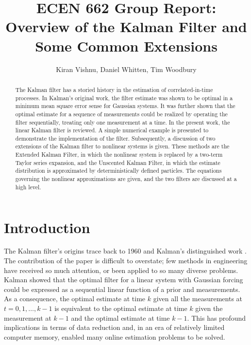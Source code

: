 \documentclass[12pt,draftcls,onecolumn]{IEEEtran}
\author{Kiran Vishnu, Daniel Whitten, Tim Woodbury}
\title{ECEN 662 Group Report: Overview of the Kalman Filter and Some Common Extensions}
\begin{document}
\maketitle

\begin{abstract}
The Kalman filter has a storied history in the estimation of correlated-in-time processes.
In Kalman's original work, the filter estimate was shown to be optimal in a minimum mean square error sense for Gaussian systems. It was further shown that the optimal estimate for a sequence of measurements could be realized by operating the filter sequentially, treating only one measurement at a time.
In the present work, the linear Kalman filter is reviewed.
A simple numerical example is presented to demonstrate the implementation of the filter.
Subsequently, a discussion of two extensions of the Kalman filter to nonlinear systems is given.
These methods are the Extended Kalman Filter, in which the nonlinear system is replaced by a two-term Taylor series expansion, and the Unscented Kalman Filter, in which the estimate distribution is approximated by deterministically defined particles.
The equations governing the nonlinear approximations are given, and the two filters are discussed at a high level.
\end{abstract}

\section{Introduction}

The Kalman filter's origins trace back to 1960 and Kalman's distinguished work \cite{kalman1960}.
The contribution of the paper is difficult to overstate; few methods in engineering have received so much attention, or been applied to so many diverse problems.
Kalman showed that the optimal filter for a linear system with Gaussian forcing could be expressed as a sequential linear function of a prior and measurements.
As a consequence, the optimal estimate at time $k$ given all the measurements at $t = 0, 1, \dots, k-1$ is equivalent to the optimal estimate at time $k$ given the measurement at $k-1$ and the optimal estimate at time $k-1$.
This has profound implications in terms of data reduction and, in an era of relatively limited computer memory, enabled many online estimation problems to be solved.
\end{document}

